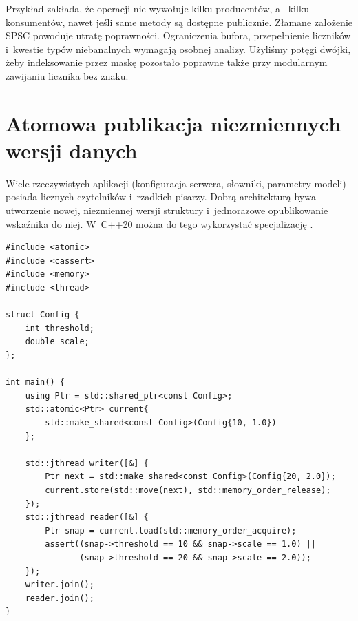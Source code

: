 Przykład zakłada, że operacji  nie wywołuje kilku
producentów, a~ kilku konsumentów, nawet jeśli
same metody są dostępne publicznie. Złamane założenie SPSC
powoduje utratę poprawności. Ograniczenia bufora, przepełnienie
liczników i~kwestie typów niebanalnych wymagają osobnej analizy.
Użyliśmy potęgi dwójki, żeby indeksowanie przez maskę pozostało
poprawne także przy modularnym zawijaniu licznika bez znaku.


\section{Atomowa publikacja niezmiennych wersji danych}
\label{sec:cpp16-snapshot}

Wiele rzeczywistych aplikacji (konfiguracja serwera, słowniki,
parametry modeli) posiada licznych czytelników i~rzadkich pisarzy.
Dobrą architekturą bywa utworzenie nowej, niezmiennej wersji
struktury i~jednorazowe opublikowanie wskaźnika do niej.
W~C++20 można do tego wykorzystać specjalizację
.

\begin{lstlisting}[caption={Bezpieczny snapshot konfiguracji (C++20).}]
#include <atomic>
#include <cassert>
#include <memory>
#include <thread>

struct Config {
    int threshold;
    double scale;
};

int main() {
    using Ptr = std::shared_ptr<const Config>;
    std::atomic<Ptr> current{
        std::make_shared<const Config>(Config{10, 1.0})
    };

    std::jthread writer([&] {
        Ptr next = std::make_shared<const Config>(Config{20, 2.0});
        current.store(std::move(next), std::memory_order_release);
    });
    std::jthread reader([&] {
        Ptr snap = current.load(std::memory_order_acquire);
        assert((snap->threshold == 10 && snap->scale == 1.0) ||
               (snap->threshold == 20 && snap->scale == 2.0));
    });
    writer.join();
    reader.join();
}
\end{lstlisting}

